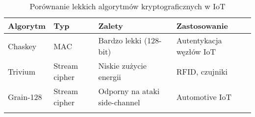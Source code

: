 \begin{enumerate}
        \begin{table}[h]
        \caption{Porównanie lekkich algorytmów kryptograficznych w IoT}
        \label{tab:algorytmy}
        \begin{tabular}{|l|l|l|l|}
            \hline
            \textbf{Algorytm} & \textbf{Typ} & \textbf{Zalety} & \textbf{Zastosowanie} \\ \hline
            Chaskey & MAC & Bardzo lekki (128-bit) & Autentykacja węzłów IoT \\ \hline
            Trivium & Stream cipher & Niskie zużycie energii & RFID, czujniki \\ \hline
            Grain-128 & Stream cipher & Odporny na ataki side-channel & Automotive IoT \\ \hline
            \label{tab:algorytmy}
        \end{tabular}
    \end{table}
\end{enumerate}

